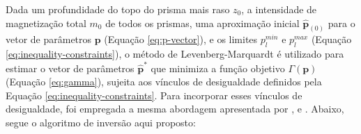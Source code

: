 Dada um profundidade do topo do prisma mais raso $z_{0}$, a intensidade de magnetização total $m_{0}$ de todos os prismas, uma aproximação inicial $\hat{\mathbf{p}}_{(0)}$ para o vetor de parâmetros $\mathbf{p}$ (Equação \ref{eq:p-vector}), e os limites 
$p_{l}^{min}$ e $p_{l}^{max}$ (Equação \ref{eq:inequality-constraints}), o método de Levenberg-Marquardt \cite[por exemplo, ][ p. 624]{seber_wild2003} é utilizado para estimar o vetor de parâmetros $\hat{\mathbf{p}}^{\ast}$ que minimiza a função objetivo $\Gamma (\mathbf{p})$ (Equação \ref{eq:gamma}), sujeita aos vínculos de desigualdade definidos pela Equação \ref{eq:inequality-constraints}.
Para incorporar esses vínculos de desigualdade, foi empregada a mesma abordagem apresentada por \cite{barbosa_etal1999}, \cite{oliveirajr_etal2011} e \cite{oliveirajr_barbosa2013}.
Abaixo, segue o algoritmo de inversão aqui proposto:

